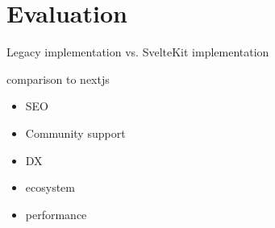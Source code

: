 \chapter{Evaluation}

Legacy implementation vs. SvelteKit implementation

comparison to nextjs

\begin{itemize}
    \item SEO
    \item Community support
    \item DX
    \item ecosystem
    \item performance 
\end{itemize}


